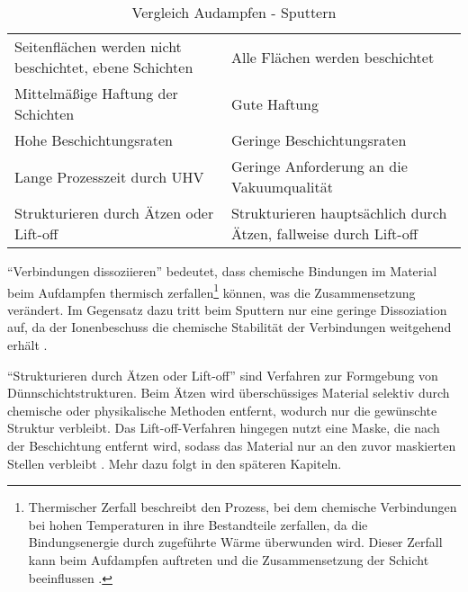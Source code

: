 \documentclass{article} %
\begin{document}
\begin{table}[htb!]
\begin{tabular}{|p{6cm}|p{6cm}|}
        Seitenflächen werden nicht beschichtet, ebene Schichten & Alle Flächen werden beschichtet \\
        Mittelmäßige Haftung der Schichten & Gute Haftung \\
        Hohe Beschichtungsraten & Geringe Beschichtungsraten \\
        Lange Prozesszeit durch UHV & Geringe Anforderung an die Vakuumqualität \\
        Strukturieren durch Ätzen oder Lift-oﬀ & Strukturieren hauptsächlich durch Ätzen, fallweise durch Lift-off \\ \hline
    \end{tabular}
    \captionsetup{labelfont=bf} %
    \caption{Vergleich Audampfen - Sputtern \cite{keplinger2024}}
    \label{tab:Vergleich Aufdampfen - Sputtern}
\end{table}

\vspace{1em}

``Verbindungen dissoziieren'' bedeutet, dass chemische Bindungen im Material beim Aufdampfen thermisch zerfallen\footnote{Thermischer Zerfall beschreibt den Prozess, 
bei dem chemische Verbindungen bei hohen Temperaturen in ihre Bestandteile zerfallen, da die Bindungsenergie durch zugeführte Wärme überwunden wird. Dieser Zerfall 
kann beim Aufdampfen auftreten und die Zusammensetzung der Schicht beeinflussen \cite{ohring2002, smith1995}.} können, was die Zusammensetzung verändert. Im 
Gegensatz dazu tritt beim Sputtern nur eine geringe Dissoziation auf, da der Ionenbeschuss die chemische Stabilität der Verbindungen weitgehend erhält 
\cite{ohring2002, smith1995, rossnagel2003magnetron}.

\vspace{1em}
``Strukturieren durch Ätzen oder Lift-off'' sind Verfahren zur Formgebung von Dünnschichtstrukturen. Beim Ätzen wird überschüssiges Material selektiv durch 
chemische oder physikalische Methoden entfernt, wodurch nur die gewünschte Struktur verbleibt. Das Lift-off-Verfahren hingegen nutzt eine Maske, die nach der 
Beschichtung entfernt wird, sodass das Material nur an den zuvor maskierten Stellen verbleibt \cite{ohring2002, smith1995, prechtl2005grundlagen}. Mehr dazu folgt 
in den späteren Kapiteln.

\vspace{1em}
\end{document}
